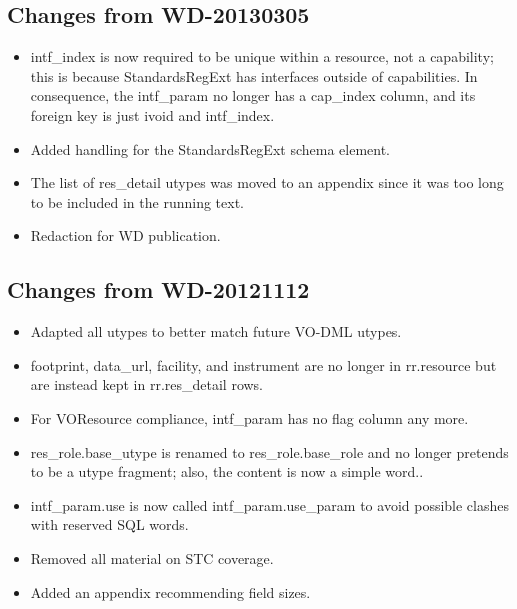 \documentclass[11pt,a4paper]{ivoa}
\begin{document}
\subsection{Changes from WD-20130305}

\label{changes-20130305}

\begin{itemize}

\item intf\_index is now required to be unique within a resource, not a
capability; this is because StandardsRegExt has interfaces outside
of capabilities.  In consequence, the intf\_param no longer has a
cap\_index column, and its foreign key is just ivoid and intf\_index.{}

\item Added handling for the StandardsRegExt schema element.{}

\item The list of res\_detail utypes was moved to an appendix since
it was too long to be included in the running text.{}

\item Redaction for WD publication.{}

\end{itemize}

\subsection{Changes from WD-20121112}

\label{changes-20121112}

\begin{itemize}

\item Adapted all utypes to better match future VO-DML utypes.{}

\item footprint, data\_url, facility, and instrument are no longer in rr.resource
but are instead kept in rr.res\_detail rows.{}

\item For VOResource compliance, intf\_param has no flag column any more.{}

\item res\_role.base\_utype is renamed to res\_role.base\_role and no longer
pretends to be a utype fragment; also, the content is now a simple
word..{}

\item intf\_param.use is now called intf\_param.use\_param to avoid possible
clashes with reserved SQL words.{}

\item Removed all material on STC coverage.{}

\item Added an appendix recommending field sizes.{}

\end{itemize}



\end{document}
